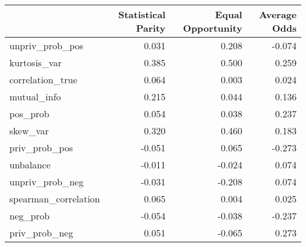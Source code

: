 \begin{tabular}{lrrr}
\toprule
 & Statistical Parity & Equal Opportunity & Average Odds \\
\midrule
unpriv_prob_pos & 0.031 & 0.208 & -0.074 \\
kurtosis_var & 0.385 & 0.500 & 0.259 \\
correlation_true & 0.064 & 0.003 & 0.024 \\
mutual_info & 0.215 & 0.044 & 0.136 \\
pos_prob & 0.054 & 0.038 & 0.237 \\
skew_var & 0.320 & 0.460 & 0.183 \\
priv_prob_pos & -0.051 & 0.065 & -0.273 \\
unbalance & -0.011 & -0.024 & 0.074 \\
unpriv_prob_neg & -0.031 & -0.208 & 0.074 \\
spearman_correlation & 0.065 & 0.004 & 0.025 \\
neg_prob & -0.054 & -0.038 & -0.237 \\
priv_prob_neg & 0.051 & -0.065 & 0.273 \\
\bottomrule
\end{tabular}
